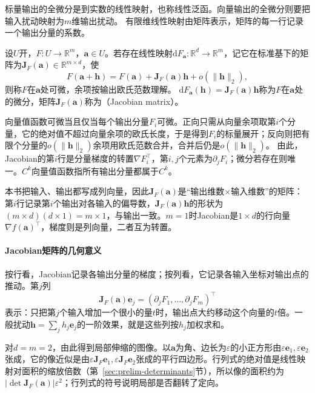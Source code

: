 标量输出的全微分是到实数的线性映射，也称线性泛函。向量输出的全微分则要把输入扰动映射为$m$维输出扰动。
有限维线性映射由矩阵表示，矩阵的每一行记录一个输出分量的系数。
\begin{definition}[向量值函数的微分]
\label{def:multivariable-vector-differential}
设$U$开，$F:U\to\mathbb R^m$，$\bm a\in U$。若存在线性映射$\mathrm dF_{\bm a}:\mathbb R^d\to\mathbb R^m$，记它在标准基下的矩阵为$\bm J_F(\bm a)\in\mathbb R^{m\times d}$，使
\begin{equation}
 F(\bm a+\bm h)=F(\bm a)+\bm J_F(\bm a)\bm h+o(\lVert\bm h\rVert_2),
\label{eq:analysis-jacobian-linearization}
\end{equation}
则称$F$在$\bm a$处可微，余项按输出欧氏范数理解。
$\mathrm dF_{\bm a}(\bm h)=\bm J_F(\bm a)\bm h$称为$F$在$\bm a$处的微分，矩阵$\bm J_F(\bm a)$称为（Jacobian matrix）。
\end{definition}
向量值函数可微当且仅当每个输出分量$F_i$可微。正向只需从向量余项取第$i$个分量，它的绝对值不超过向量余项的欧氏长度，于是得到$F_i$的标量展开；反向则把有限个分量的$o(\lVert\bm h\rVert_2)$余项用欧氏范数合并，合并后仍是$o(\lVert\bm h\rVert_2)$。
由此，Jacobian的第$i$行是分量梯度的转置$\nabla F_i^\top$，第$i,j$个元素为$\partial_jF_i$；微分若存在则唯一。$C^k$向量值函数指所有输出分量都属于$C^k$。

本书把输入、输出都写成列向量，因此$\bm J_F(\bm a)$是“输出维数$\times$输入维数”的矩阵：第$i$行记录第$i$个输出对各输入的偏导数，$\bm J_F(\bm a)\bm h$的形状为$(m\times d)(d\times1)=m\times1$，与输出一致。$m=1$时Jacobian是$1\times d$的行向量$\nabla f(\bm a)^\top$，梯度则是列向量，二者互为转置。

\paragraph{Jacobian矩阵的几何意义}
按行看，Jacobian记录各输出分量的梯度；按列看，它记录各输入坐标对输出点的推动。第$j$列
\[
 \bm J_F(\bm a)\bm e_j=(\partial_jF_1,\ldots,\partial_jF_m)^\top
\]
表示：只把第$j$个输入增加一个很小的量$t$时，输出点大约移动这个向量的$t$倍。一般扰动$\bm h=\sum_jh_j\bm e_j$的一阶效果，就是这些列按$h_j$加权求和。

对$d=m=2$，由此得到局部伸缩的图像。以$\bm a$为角、边长为$\varepsilon$的小正方形由$\varepsilon\bm e_1,\varepsilon\bm e_2$张成，它的像近似是由$\varepsilon\bm J_F\bm e_1,\varepsilon\bm J_F\bm e_2$张成的平行四边形。行列式的绝对值是线性映射对面积的缩放倍数（第~\ref{sec:prelim-determinants}节），所以像的面积约为$|\det\bm J_F(\bm a)|\varepsilon^2$；行列式的符号说明局部是否翻转了定向。

